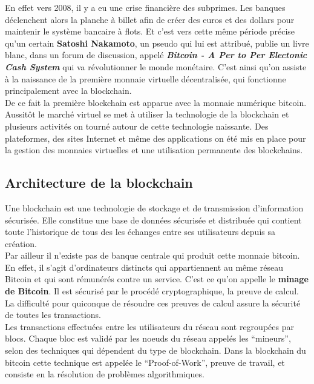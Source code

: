 \documentclass[12pt]{report}
\begin{document}
\hspace{1cm} En effet vers 2008, il y a eu une crise financière des subprimes. Les banques déclenchent alors la planche à billet afin de créer des euros et des dollars pour maintenir le système bancaire à flots. Et c'est vers cette même période précise qu'un certain \textbf{Satoshi Nakamoto}, un pseudo qui lui est attribué, publie un livre blanc, dans un forum de discussion, appelé \textbf{\textit{Bitcoin - A Per to Per Electonic Cash System }} qui va révolutionner le monde monétaire. C'est ainsi qu'on assiste à la naissance  de la première monnaie virtuelle décentralisée, qui fonctionne principalement avec la blockchain. \\ 

\hspace{1cm} De ce fait la première blockchain est apparue avec la monnaie numérique bitcoin. Aussitôt le marché virtuel se met à utiliser la technologie de la blockchain et plusieurs activités on tourné autour de cette technologie naissante. Des plateformes, des sites Internet et même des applications on été mis en place pour la gestion des monnaies virtuelles et une utilisation permanente des blockchains.

	\subsection{Architecture de la blockchain}
Une blockchain est une technologie de stockage et de transmission d’information sécurisée. Elle constitue une base de données sécurisée et distribuée qui contient toute l’historique de tous des les échanges entre ses utilisateurs depuis sa création. \\

Par ailleur il n’existe pas de banque centrale qui produit cette monnaie bitcoin. En effet, il s’agit d’ordinateurs distincts qui appartiennent au même réseau Bitcoin et qui sont rémunérés contre un service. C’est ce qu’on appelle le \textbf{minage de Bitcoin}. Il est sécurisé par le procédé cryptographique, la preuve de calcul. La difficulté pour quiconque de résoudre ces preuves de calcul assure la sécurité de toutes les transactions.\\

Les transactions effectuées entre les utilisateurs du réseau sont regroupées par blocs. Chaque bloc est validé par les noeuds du réseau appelés les “mineurs”, selon des techniques qui dépendent du type de blockchain. Dans la blockchain du bitcoin cette technique est appelée le “Proof-of-Work”, preuve de travail, et consiste en la résolution de problèmes algorithmiques.\\
\end{document}
